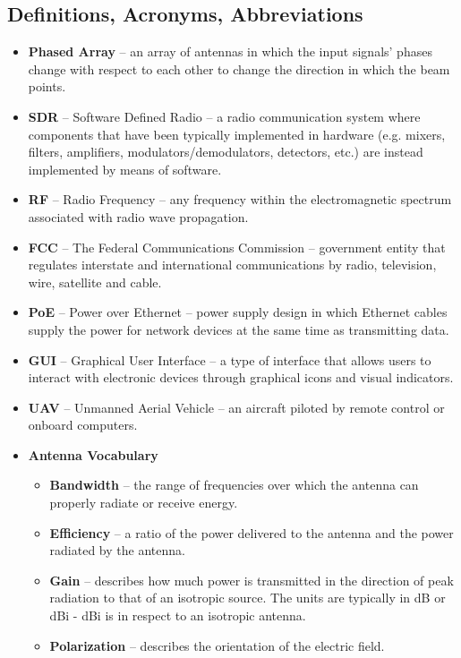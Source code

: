 \documentclass[ProductRequirements.tex]{subfiles}
\begin{document}
	\subsection{Definitions, Acronyms, Abbreviations}
		\begin{itemize}
			\item \textbf{Phased Array} -- an array of antennas in which the input signals' phases change with respect to each other to change the direction in which the beam points.
			\item \textbf{SDR} -- Software Defined Radio -- a radio communication system where components that have been typically implemented in hardware (e.g. mixers, filters, amplifiers, modulators/demodulators, detectors, etc.) are instead implemented by means of software. 
			\item \textbf{RF} -- Radio Frequency --  any frequency within the electromagnetic spectrum associated with radio wave propagation. 
			\item \textbf{FCC} -- The Federal Communications Commission -- government entity that regulates interstate and international communications by radio, television, wire, satellite and cable.
			\item \textbf{PoE} -- Power over Ethernet -- power supply design in which Ethernet cables supply the power for network devices at the same time as transmitting data. 
			\item \textbf{GUI} -- Graphical User Interface -- a type of interface that allows users to interact with electronic devices through graphical icons and visual indicators.
			\item \textbf{UAV} -- Unmanned Aerial Vehicle -- an aircraft piloted by remote control or onboard computers.
			\item \textbf{Antenna Vocabulary}
			\begin{itemize}
				\item \textbf{Bandwidth} -- the range of frequencies over which the antenna can properly radiate or receive energy.
				\item \textbf{Efficiency} -- a ratio of the power delivered to the antenna and the power radiated by the antenna.
				\item \textbf{Gain} -- describes how much power is transmitted in the direction of peak radiation to that of an isotropic source. The units are typically in dB or dBi - dBi is in respect to an isotropic antenna. 
				\item \textbf{Polarization} -- describes the orientation of the electric field.
			\end{itemize}
		\end{itemize}
\end{document}
